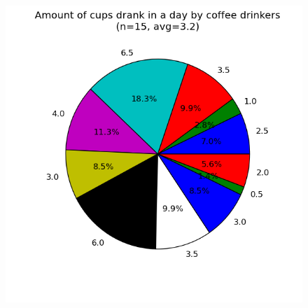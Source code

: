 \documentclass[a4paper,12pt]{article}
\begin{document}
\begin{figure}[h]
  \includegraphics[width=\textwidth]{amounts.png}
\end{figure}
\end{document}

